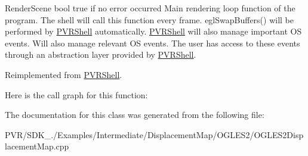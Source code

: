   Render\+Scene  bool true if no error occurred  Main rendering loop function of the program. The shell will call this function every frame. egl\+Swap\+Buffers() will be performed by \hyperlink{class_p_v_r_shell}{P\+V\+R\+Shell} automatically. \hyperlink{class_p_v_r_shell}{P\+V\+R\+Shell} will also manage important O\+S events. Will also manage relevant O\+S events. The user has access to these events through an abstraction layer provided by \hyperlink{class_p_v_r_shell}{P\+V\+R\+Shell}. 

Reimplemented from \hyperlink{class_p_v_r_shell_ae0eb5f797cbe993a22b8659f9c332578}{P\+V\+R\+Shell}.



Here is the call graph for this function\+:




The documentation for this class was generated from the following file\+:\begin{DoxyCompactItemize}
\item 
P\+V\+R/\+S\+D\+K\+\_./\+Examples/\+Intermediate/\+Displacement\+Map/\+O\+G\+L\+E\+S2/O\+G\+L\+E\+S2\+Displacement\+Map.\+cpp\end{DoxyCompactItemize}

